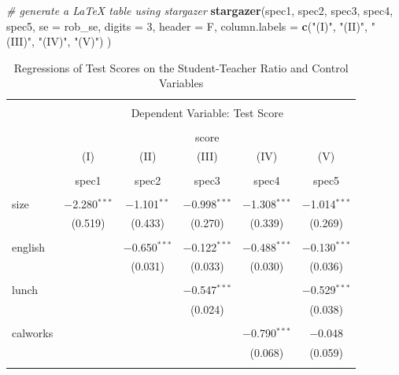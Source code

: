 \documentclass[]{book}
\newenvironment{Shaded}{\begin{snugshade}}{\end{snugshade}}
\newcommand{\KeywordTok}[1]{\textcolor[rgb]{0.13,0.29,0.53}{\textbf{#1}}}
\newcommand{\DataTypeTok}[1]{\textcolor[rgb]{0.13,0.29,0.53}{#1}}
\newcommand{\DecValTok}[1]{\textcolor[rgb]{0.00,0.00,0.81}{#1}}
\newcommand{\StringTok}[1]{\textcolor[rgb]{0.31,0.60,0.02}{#1}}
\newcommand{\CommentTok}[1]{\textcolor[rgb]{0.56,0.35,0.01}{\textit{#1}}}
\newcommand{\NormalTok}[1]{#1}
\theoremstyle{definition}
\theoremstyle{definition}
\theoremstyle{definition}
\theoremstyle{remark}
\begin{document}
\begin{Shaded}
\begin{Highlighting}[]
\CommentTok{# generate a LaTeX table using stargazer}
\KeywordTok{stargazer}\NormalTok{(spec1, spec2, spec3, spec4, spec5,}
          \DataTypeTok{se =}\NormalTok{ rob_se,}
          \DataTypeTok{digits =} \DecValTok{3}\NormalTok{,}
          \DataTypeTok{header =}\NormalTok{ F,}
          \DataTypeTok{column.labels =} \KeywordTok{c}\NormalTok{(}\StringTok{"(I)"}\NormalTok{, }\StringTok{"(II)"}\NormalTok{, }\StringTok{"(III)"}\NormalTok{, }\StringTok{"(IV)"}\NormalTok{, }\StringTok{"(V)"}\NormalTok{)}
\NormalTok{          )}
\end{Highlighting}
\end{Shaded}

\begin{table} \centering 
  \caption{\label{tab:rotsostracv} Regressions of Test Scores on the Student-Teacher Ratio and Control Variables} 
  \label{} 
\begin{tabular}{@{\extracolsep{-10pt}}lccccc} 
\\[-1.8ex]\hline 
\hline \\[-1.8ex] 
 & \multicolumn{5}{c}{Dependent Variable: Test Score} \\ 
\cline{2-6} 
\\[-1.8ex] & \multicolumn{5}{c}{score} \\ 
 & (I) & (II) & (III) & (IV) & (V) \\ 
\\[-1.8ex] & spec1 & spec2 & spec3 & spec4 & spec5\\ 
\hline \\[-1.8ex] 
 size & $-$2.280$^{***}$ & $-$1.101$^{**}$ & $-$0.998$^{***}$ & $-$1.308$^{***}$ & $-$1.014$^{***}$ \\ 
  & (0.519) & (0.433) & (0.270) & (0.339) & (0.269) \\ 
  & & & & & \\ 
 english &  & $-$0.650$^{***}$ & $-$0.122$^{***}$ & $-$0.488$^{***}$ & $-$0.130$^{***}$ \\ 
  &  & (0.031) & (0.033) & (0.030) & (0.036) \\ 
  & & & & & \\ 
 lunch &  &  & $-$0.547$^{***}$ &  & $-$0.529$^{***}$ \\ 
  &  &  & (0.024) &  & (0.038) \\ 
  & & & & & \\ 
 calworks &  &  &  & $-$0.790$^{***}$ & $-$0.048 \\ 
  &  &  &  & (0.068) & (0.059) \\ 
  & & & & & \\ 

\end{tabular}
\end{table}
\end{document}
